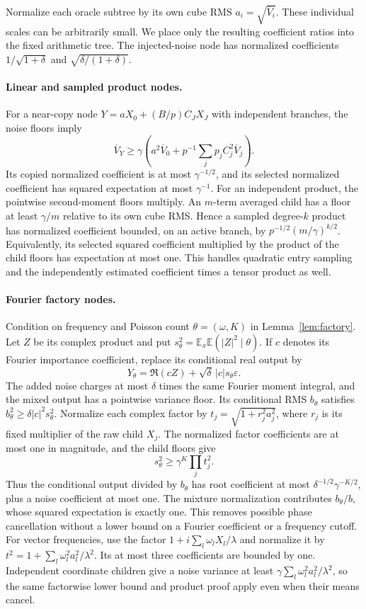 \documentclass[11pt]{article}
\theoremstyle{remark}\newtheorem{remark}[theorem]{Remark}
\newcommand{\E}{\mathbb E}
\begin{document}
Normalize each oracle subtree by its own cube RMS
$a_i=\sqrt{\overline V_i}$. These individual scales can be arbitrarily
small. We place only the resulting coefficient ratios into the fixed
arithmetic tree. The injected-noise node has normalized coefficients
$1/\sqrt{1+\delta}$ and $\sqrt{\delta/(1+\delta)}$.

\paragraph{Linear and sampled product nodes.}
For a near-copy node
$Y=aX_0+(B/p)C_JX_J$ with independent branches, the noise floors imply
\[
 \overline V_Y\ge\gamma\left(a^2\overline V_0+
                 p^{-1}\sum_jp_jC_j^2\overline V_j\right).
\]
Its copied normalized coefficient is at most $\gamma^{-1/2}$, and its
selected normalized coefficient has squared expectation at most
$\gamma^{-1}$. For an independent product, the pointwise second-moment
floors multiply. An $m$-term averaged child has a floor at least
$\gamma/m$ relative to its own cube RMS. Hence a sampled degree-$k$
product has normalized coefficient bounded, on an active branch, by
$p^{-1/2}(m/\gamma)^{k/2}$. Equivalently, its selected squared
coefficient multiplied by the product of the child floors has expectation
at most one. This handles quadratic entry sampling and the independently
estimated coefficient times a tensor product as well.

\paragraph{Fourier factory nodes.}
Condition on frequency and Poisson count $\theta=(\omega,K)$ in
Lemma~\ref{lem:factory}. Let $Z$ be its complex product and put
$s_\theta^2=\E_x\E(|Z|^2\mid\theta)$. If $c$ denotes its Fourier
importance coefficient, replace its conditional real output by
\[
 Y_\theta=\Re(cZ)+\sqrt\delta\,|c|s_\theta\varepsilon.
\]
The added noise charges at most $\delta$ times the same Fourier moment
integral, and the mixed output has a pointwise variance floor. Its
conditional RMS $b_\theta$ satisfies
$b_\theta^2\ge\delta|c|^2s_\theta^2$. Normalize each complex factor by
$t_j=\sqrt{1+r_j^2a_j^2}$, where $r_j$ is its fixed multiplier of the
raw child $X_j$. The normalized factor coefficients are at most one in magnitude,
and the child floors give
\[
 s_\theta^2\ge\gamma^K\prod_jt_j^2.
\]
Thus the conditional output divided by $b_\theta$ has root coefficient
at most $\delta^{-1/2}\gamma^{-K/2}$, plus a noise coefficient at most
one. The mixture normalization contributes $b_\theta/b$, whose squared
expectation is exactly one. This removes possible phase cancellation
without a lower bound on a Fourier coefficient or a frequency cutoff.
For vector frequencies, use the factor
$1+i\sum_l\omega_lX_l/\lambda$ and normalize it by
$t^2=1+\sum_l\omega_l^2a_l^2/\lambda^2$. Its at most three coefficients
are bounded by one. Independent coordinate children give a noise variance
at least $\gamma\sum_l\omega_l^2a_l^2/\lambda^2$, so the same factorwise
lower bound and product proof apply even when their means cancel.
\end{document}
